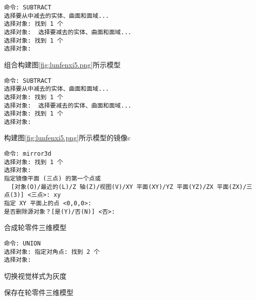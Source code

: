 \begin{procedure}
\begin{lstlisting}
命令: SUBTRACT
选择要从中减去的实体、曲面和面域...
选择对象: 找到 1 个
选择对象:  选择要减去的实体、曲面和面域...
选择对象: 找到 1 个
选择对象:
\end{lstlisting}

\item 组合构建图\ref{fig:lunfenxi5.png}所示模型

\begin{lstlisting}
命令: SUBTRACT
选择要从中减去的实体、曲面和面域...
选择对象: 找到 1 个
选择对象:  选择要减去的实体、曲面和面域...
选择对象: 找到 1 个
选择对象:
\end{lstlisting}

\item 构建图\ref{fig:lunfenxi5.png}所示模型的镜像c

\begin{lstlisting}
命令: mirror3d
选择对象: 找到 1 个
选择对象:
指定镜像平面 (三点) 的第一个点或
  [对象(O)/最近的(L)/Z 轴(Z)/视图(V)/XY 平面(XY)/YZ 平面(YZ)/ZX 平面(ZX)/三点(3)] <三点>: xy
指定 XY 平面上的点 <0,0,0>:
是否删除源对象？[是(Y)/否(N)] <否>:
\end{lstlisting}

\item 合成轮零件三维模型

\begin{lstlisting}
命令: UNION
选择对象: 指定对角点: 找到 2 个
选择对象:
\end{lstlisting}

\item 切换视觉样式为灰度

\item 保存在轮零件三维模型

\end{procedure}
\endinput